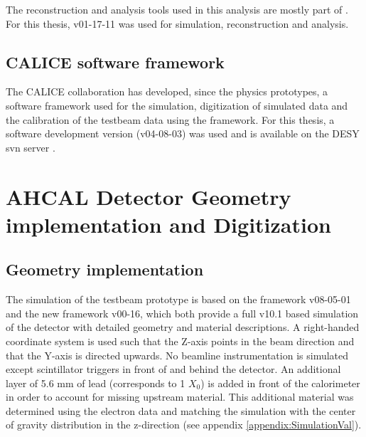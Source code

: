 The reconstruction and analysis tools used in this analysis are mostly part of \ilcsoft. For this thesis, \ilcsoft v01-17-11 was used for simulation, reconstruction and analysis.

\subsection{CALICE software framework}

The CALICE collaboration has developed, since the physics prototypes, a software framework used for the simulation, digitization of simulated data and the calibration of the testbeam data using the \marlin framework. For this thesis, a software development version (v04-08-03) was used and is available on the DESY svn server \cite{CALICESoft, 6036245}.

\section{AHCAL Detector Geometry implementation and Digitization}

\subsection{Geometry implementation}

The simulation of the testbeam prototype is based on the \mokka \cite{MoradeFreitas:2002kj} framework v08-05-01 and the new \ddhep \cite{Frank:2014zya} framework v00-16, which both provide a full \geant v10.1 based simulation of the detector with detailed geometry and material descriptions. A right-handed coordinate system is used such that the Z-axis points in the beam direction and that the Y-axis is directed upwards. No beamline instrumentation is simulated except scintillator triggers in front of and behind the detector. An additional layer of 5.6 mm of lead (corresponds to 1 $X_0$) is added in front of the calorimeter in order to account for missing upstream material. This additional material was determined using the electron data and matching the simulation with the center of gravity distribution in the z-direction (see appendix \ref{appendix:SimulationVal}).

